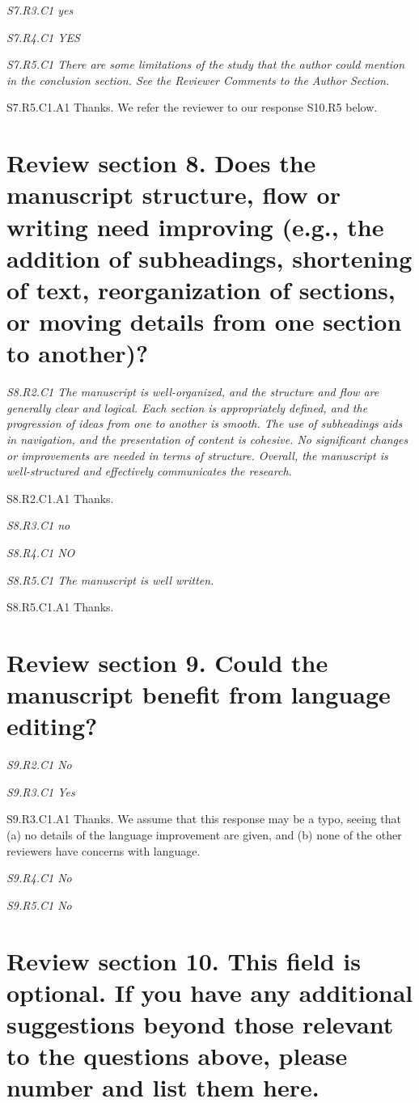 \documentclass[a4paper,10pt]{article}
\begin{document}
	\emph{S7.R3.C1 yes}

	\emph{S7.R4.C1 YES}

	\emph{S7.R5.C1 There are some limitations of the study that the author could mention in the conclusion section. See the Reviewer Comments to the Author Section.}

	S7.R5.C1.A1 Thanks. We refer the reviewer to our response S10.R5 below.

	\section*{Review section 8. Does the manuscript structure, flow or writing need improving (e.g., the addition of subheadings, shortening of text, reorganization of sections, or moving details from one section to another)?}

	\emph{S8.R2.C1 The manuscript is well-organized, and the structure and flow are generally clear and logical. Each section is appropriately defined, and the progression of ideas from one to another is smooth. The use of subheadings aids in navigation, and the presentation of content is cohesive. No significant changes or improvements are needed in terms of structure. Overall, the manuscript is well-structured and effectively communicates the research.}
	
	S8.R2.C1.A1 Thanks.

	\emph{S8.R3.C1 no}

	\emph{S8.R4.C1 NO}

	\emph{S8.R5.C1 The manuscript is well written.}

	S8.R5.C1.A1 Thanks.

	\section*{Review section 9. Could the manuscript benefit from language editing?}

	\emph{S9.R2.C1 No}

	\emph{S9.R3.C1 Yes}

	S9.R3.C1.A1 Thanks. We assume that this response may be a typo, seeing that (a) no details of the language improvement are given, and (b) none of the other reviewers have concerns with language.

	\emph{S9.R4.C1 No}

	\emph{S9.R5.C1 No}

	\section*{Review section 10. This field is optional. If you have any additional suggestions beyond those relevant to the questions above, please number and list them here.}
\end{document}

